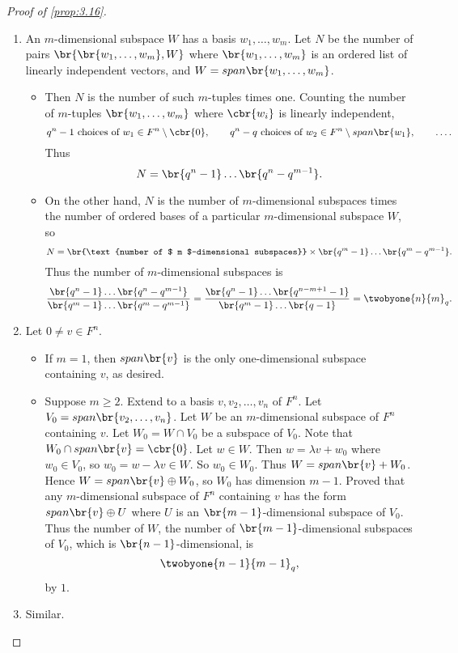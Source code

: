 \begin{proof}[Proof of \ref{prop:3.16}]
\hfill
\begin{enumerate}
\item An $ m $-dimensional subspace $ W $ has a basis $ w_1, \dots, w_m $. Let $ N $ be the number of pairs $ \br{\br{w_1, \dots, w_m}, W} $ where $ \br{w_1, \dots, w_m} $ is an ordered list of linearly independent vectors, and $ W = span\br{w_1, \dots, w_m} $.
\begin{itemize}
\item Then $ N $ is the number of such $ m $-tuples times one. Counting the number of $ m $-tuples $ \br{w_1, \dots, w_m} $ where $ \cbr{w_i} $ is linearly independent,
$$ q^n - 1 \ \text{choices of} \ w_1 \in F^n \setminus \cbr{0}, \qquad q^n - q \ \text{choices of} \ w_2 \in F^n \setminus span\br{w_1}, \qquad \dots. $$
Thus
$$ N = \br{q^n - 1} \dots \br{q^n - q^{m - 1}}. $$
\item On the other hand, $ N $ is the number of $ m $-dimensional subspaces times the number of ordered bases of a particular $ m $-dimensional subspace $ W $, so
$$ N = \br{\text{number of $ m $-dimensional subspaces}} \times \br{q^m - 1} \dots \br{q^m - q^{m - 1}}. $$
Thus the number of $ m $-dimensional subspaces is
$$ \dfrac{\br{q^n - 1} \dots \br{q^n - q^{m - 1}}}{\br{q^m - 1} \dots \br{q^m - q^{m - 1}}} = \dfrac{\br{q^n - 1} \dots \br{q^{n - m + 1} - 1}}{\br{q^m - 1} \dots \br{q - 1}} = \twobyone{n}{m}_q. $$
\end{itemize}
\item Let $ 0 \ne v \in F^n $.
\begin{itemize}
\item If $ m = 1 $, then $ span\br{v} $ is the only one-dimensional subspace containing $ v $, as desired.
\item Suppose $ m \ge 2 $. Extend to a basis $ v, v_2, \dots, v_n $ of $ F^n $. Let $ V_0 = span\br{v_2, \dots, v_n} $. Let $ W $ be an $ m $-dimensional subspace of $ F^n $ containing $ v $. Let $ W_0 = W \cap V_0 $ be a subspace of $ V_0 $. Note that $ W_0 \cap span\br{v} = \cbr{0} $. Let $ w \in W $. Then $ w = \lambda v + w_0 $ where $ w_0 \in V_0 $, so $ w_0 = w - \lambda v \in W $. So $ w_0 \in W_0 $. Thus $ W = span\br{v} + W_0 $. Hence $ W = span\br{v} \oplus W_0 $, so $ W_0 $ has dimension $ m - 1 $. Proved that any $ m $-dimensional subspace of $ F^n $ containing $ v $ has the form $ span\br{v} \oplus U $ where $ U $ is an $ \br{m - 1} $-dimensional subspace of $ V_0 $. Thus the number of $ W $, the number of $ \br{m - 1} $-dimensional subspaces of $ V_0 $, which is $ \br{n - 1} $-dimensional, is
$$ \twobyone{n - 1}{m - 1}_q, $$
by $ 1 $.
\end{itemize}
\item Similar.
\end{enumerate}
\end{proof}

